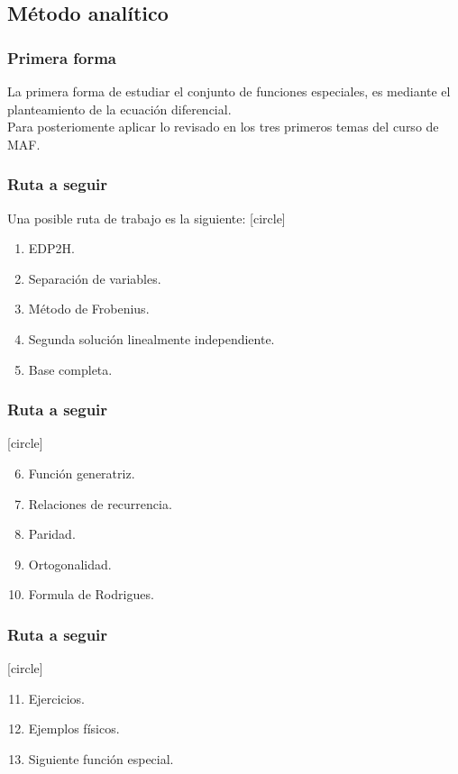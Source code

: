 \subsection{Método analítico}
\begin{frame}
\frametitle{Primera forma}
La primera forma de estudiar el conjunto de funciones especiales, es mediante el planteamiento de la ecuación diferencial.
\\
\bigskip
\pause
Para posteriomente aplicar lo revisado en los tres primeros temas del curso de MAF.
\end{frame}
\begin{frame}
\frametitle{Ruta a seguir}
Una posible ruta de trabajo es la siguiente:
[circle]
\begin{enumerate}[<+->]
\item EDP2H.
\item Separación de variables.
\item Método de Frobenius.
\item Segunda solución linealmente independiente.
\item Base completa.
\end{enumerate}
\end{frame}
\begin{frame}
\frametitle{Ruta a seguir}
[circle]
\begin{enumerate}[<+->]
\setcounter{enumi}{5}
\item Función generatriz.
\item Relaciones de recurrencia.
\item Paridad.
\item Ortogonalidad.
\item Formula de Rodrigues.
\end{enumerate}
\end{frame}
\begin{frame}
\frametitle{Ruta a seguir}
[circle]
\begin{enumerate}[<+->]
\setcounter{enumi}{10}
\item Ejercicios.
\item Ejemplos físicos.
\item Siguiente función especial.
\end{enumerate}
\end{frame}
